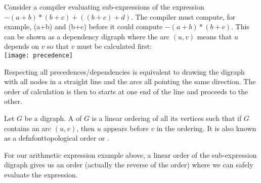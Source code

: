 %
\begin{Boxample}[0]
Consider a compiler evaluating sub-expressions of the expression $-(a+b) * (b+c) + ((b+c)+d)$.  
The compiler must compute, for example, (a+b) and (b+c) before it could compute $-(a+b) * (b+c)$. 
This can be shown as a dependency digraph where the arc $(u,v)$ means that $u$ depends on $v$ so that $v$ must be calculated first:\\
\texttt{[image: precedence]}
\end{Boxample}

Respecting all precedences/dependencies is equivalent to drawing the digraph with all nodes in a straight line and the arcs all pointing the same direction. 
The order of calculation is then to starts at one end of the line and proceeds to the other.

\begin{Definition}
Let $G$ be a digraph. A  of $G$ is a linear
ordering of all its vertices such that if $G$ contains an arc $(u,v)$,
then $u$ appears before $v$ in the ordering. It is also known as  a defnfont{topological order} or .
\end{Definition}

For our arithmetic expression example above, a linear
order of the sub-expression digraph gives us an order (actually the reverse
of the order) where we can safely evaluate the expression.


